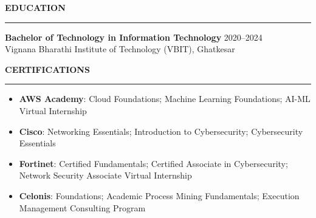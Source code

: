 \documentclass{resume}
\renewenvironment{rSection}[1]{
    \vspace{8pt}
    \noindent
    {\bfseries\MakeUppercase{#1}}
    \par
    \vspace{-3.5pt}
    \noindent\rule{\textwidth}{0.4pt}
    \par
    \vspace{4pt}
}{
    \vspace{3pt}
}
\begin{document}

\begin{rSection}{EDUCATION}

\textbf{Bachelor of Technology in Information Technology}
\hfill 2020--2024 \\
Vignana Bharathi Institute of Technology (VBIT), Ghatkesar

\end{rSection}


\begin{rSection}{CERTIFICATIONS}

\vspace{-2pt}

\begin{itemize}
    \item \textbf{AWS Academy}: Cloud Foundations; Machine Learning Foundations; AI-ML Virtual Internship
    \item \textbf{Cisco}: Networking Essentials; Introduction to Cybersecurity; Cybersecurity Essentials
    \item \textbf{Fortinet}: Certified Fundamentals; Certified Associate in Cybersecurity; Network Security Associate Virtual Internship
    \item \textbf{Celonis}: Foundations; Academic Process Mining Fundamentals; Execution Management Consulting Program
\end{itemize}

\end{rSection}
\end{document}
